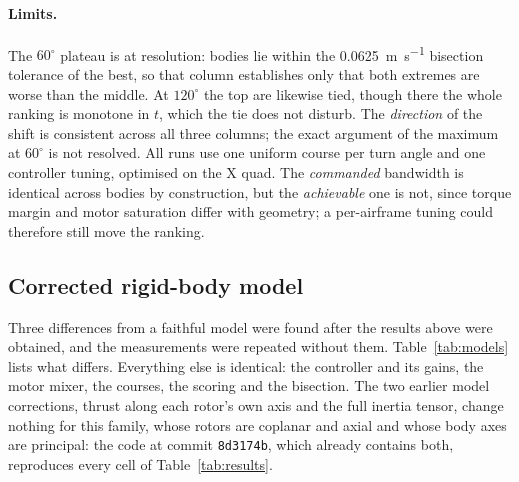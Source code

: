 \documentclass[11pt,a4paper]{article}
\begin{document}
\paragraph{Limits.} The $60^\circ$ plateau is at resolution: \NTiesSixty{}
bodies lie within the \SI{0.0625}{\metre\per\second} bisection tolerance of the
best, so that column establishes only that both extremes are worse than the
middle. At $120^\circ$ the top \NTiesOneTwenty{} are likewise tied, though there
the whole ranking is monotone in $t$, which the tie does not disturb. The
\emph{direction} of the shift is consistent across all three columns; the exact
argument of the maximum at $60^\circ$ is not resolved. All runs
use one uniform course per turn angle and one controller tuning, optimised on the
X quad. The \emph{commanded} bandwidth is identical across bodies by
construction, but the \emph{achievable} one is not, since torque margin and
motor saturation differ with geometry; a per-airframe tuning could therefore
still move the ranking.

\subsection{Corrected rigid-body model}
\label{sec:corrected}

Three differences from a faithful model were found after the results above
were obtained, and the measurements were repeated without them.
Table~\ref{tab:models} lists what differs. Everything else is identical: the
controller and its gains, the motor mixer, the courses, the scoring and the
bisection. The two earlier model corrections, thrust along each rotor's own axis
and the full inertia tensor, change nothing for this family, whose rotors are
coplanar and axial and whose body axes are principal: the code at commit
\texttt{8d3174b}, which already contains both, reproduces every cell of
Table~\ref{tab:results}.
\end{document}
